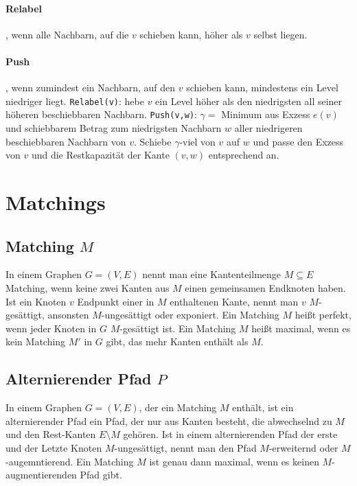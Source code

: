 \documentclass[10pt,a4paper,landscape]{article}
\begin{document}
\begin{multicols*}{2}
    \paragraph*{Relabel}, wenn alle Nachbarn, auf die $v$ schieben kann, höher als $v$ selbst liegen.
    \paragraph*{Push}, wenn zumindest ein Nachbarn, auf den $v$ schieben kann, mindestens ein Level niedriger liegt.
    \newline
    \verb|Relabel(v)|: hebe $v$ ein Level höher als den niedrigsten all seiner höheren beschiebbaren Nachbarn.
    \newline
    \verb|Push(v,w)|: $\gamma = $ Minimum aus Exzess $e(v)$ und schiebbarem Betrag zum niedrigsten Nachbarn $w$ aller niedrigeren beschiebbaren Nachbarn von $v$. 
    Schiebe $\gamma$-viel von $v$ auf $w$ und passe den Exzess von $v$ und die Restkapazität der Kante $(v,w)$ entsprechend an. 

\section{ Matchings }
    \subsection*{ Matching $M$ }
    In einem Graphen $G = (V,E)$ nennt man eine Kantenteilmenge $M \subseteq E$ Matching, wenn keine zwei Kanten aus $M$ einen gemeinsamen Endknoten haben. 
    Ist ein Knoten $v$ Endpunkt einer in $M$ enthaltenen Kante, nennt man $v$ $M$-gesättigt, ansonsten $M$-ungesättigt oder exponiert. 
    \newline
    Ein Matching $M$ heißt perfekt, wenn jeder Knoten in $G$ $M$-gesättigt ist. 
    \newline
    Ein Matching $M$ heißt maximal, wenn es kein Matching $M'$ in $G$ gibt, das mehr Kanten enthält als $M$.
    \subsection*{ Alternierender Pfad $P$ }
    In einem Graphen $G = (V,E)$, der ein Matching $M$ enthält, ist ein alternierender Pfad ein Pfad, der nur aus Kanten besteht, die abwechselnd zu $M$ und 
    den Rest-Kanten $E \setminus M$ gehören. Ist in einem alternierenden Pfad der erste und der Letzte Knoten $M$-ungesättigt, nennt man den Pfad 
    $M$-erweiternd oder $M$-augemntierend.
    \newline
    Ein Matching $M$ ist genau dann maximal, wenn es keinen $M$-augmentierenden Pfad gibt.

\end{multicols*}
\end{document}

